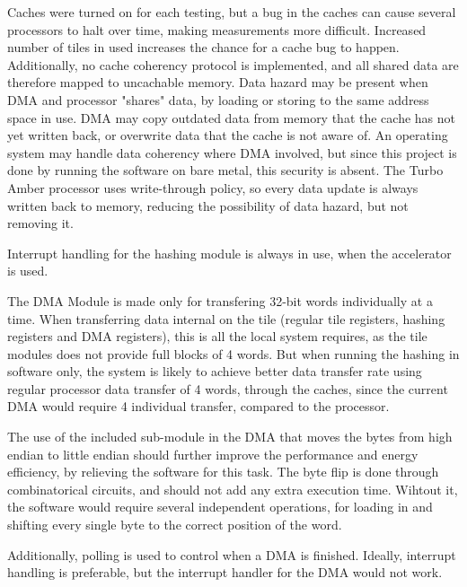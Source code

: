Caches were turned on for each testing, but a bug in the caches can cause several processors to halt over time, making measurements more difficult.
Increased number of tiles in used increases the chance for a cache bug to happen.
Additionally, no cache coherency protocol is implemented, and all shared data are therefore mapped to uncachable memory.
Data hazard may be present when DMA and processor "shares" data, by loading or storing to the same address space in use.
DMA may copy outdated data from memory that the cache has not yet written back, or overwrite data that the cache is not aware of.
An operating system may handle data coherency where DMA involved, but since this project is done by running the software on bare metal, this security is absent.
The Turbo Amber processor uses write-through policy, so every data update is always written back to memory,  reducing the possibility of data hazard, but not removing it.

Interrupt handling for the hashing module is always in use, when the accelerator is used.

The DMA Module is made only for transfering 32-bit words individually at a time.
When transferring data internal on the tile (regular tile registers, hashing registers and DMA registers), this is all the local system requires, as the tile modules does not provide full blocks of 4 words.
But when running the hashing in software only, the system is likely to achieve better data transfer rate using regular processor data transfer of 4 words, through the caches, since the current DMA would require 4 individual transfer, compared to the processor.

The use of the included sub-module in the DMA that moves the bytes from high endian to little endian should further improve the performance and energy efficiency, by relieving the software for this task.
The byte flip is done through combinatorical circuits, and should not add any extra execution time.
Wihtout it, the software would require several independent operations, for loading in and shifting every single byte to the correct position of the word.

Additionally, polling is used to control when a DMA is finished.
Ideally, interrupt handling is preferable, but the interrupt handler for the DMA would not work. 
